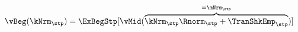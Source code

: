   \begin{equation}\begin{gathered}\begin{aligned}
\vBeg(\kNrm_{\stp}) & = \ExBegStp[\vMid(\overbrace{\kNrm_{\stp} \Rnorm_{\stp} + \TranShkEmp_{\stp}}^{=\mNrm_{\stp}})]  \label{eq:vBeg}
      \end{aligned}\end{gathered}\end{equation}
